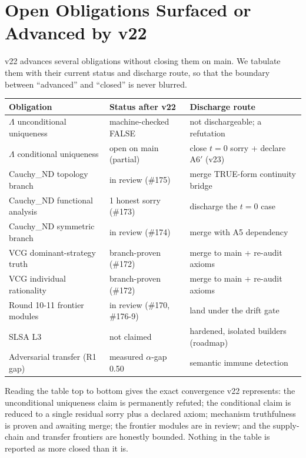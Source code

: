 \documentclass[11pt]{article}
\theoremstyle{plain}
\theoremstyle{definition}
\theoremstyle{remark}
\newcommand{\La}{\Lambda}
\begin{document}
\section{Open Obligations Surfaced or Advanced by v22}

v22 advances several obligations without closing them on main. We tabulate them with
their current status and discharge route, so that the boundary between ``advanced''
and ``closed'' is never blurred.

\begin{center}
\begin{tabular}{@{}p{4.2cm}p{3.6cm}p{4.5cm}@{}}
\toprule
\textbf{Obligation} & \textbf{Status after v22} & \textbf{Discharge route} \\
\midrule
$\La$ unconditional uniqueness & machine-checked FALSE & not dischargeable; a refutation \\
$\La$ conditional uniqueness & open on main (partial) & close $t=0$ sorry + declare A6$'$ (v23) \\
Cauchy\_ND topology branch & in review (\#175) & merge TRUE-form continuity bridge \\
Cauchy\_ND functional analysis & 1 honest sorry (\#173) & discharge the $t=0$ case \\
Cauchy\_ND symmetric branch & in review (\#174) & merge with A5 dependency \\
VCG dominant-strategy truth & branch-proven (\#172) & merge to main + re-audit axioms \\
VCG individual rationality & branch-proven (\#172) & merge to main + re-audit axioms \\
Round 10-11 frontier modules & in review (\#170, \#176-9) & land under the drift gate \\
SLSA L3 & not claimed & hardened, isolated builders (roadmap) \\
Adversarial transfer (R1 gap) & measured $\alpha$-gap 0.50 & semantic immune detection \\
\bottomrule
\end{tabular}
\end{center}

Reading the table top to bottom gives the exact convergence v22 represents: the
unconditional uniqueness claim is permanently refuted; the conditional claim is
reduced to a single residual sorry plus a declared axiom; mechanism truthfulness is
proven and awaiting merge; the frontier modules are in review; and the supply-chain
and transfer frontiers are honestly bounded. Nothing in the table is reported as more
closed than it is.
\end{document}
